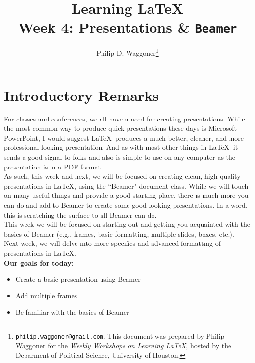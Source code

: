 \documentclass[11pt]{article}
\newcommand{\forceindent}{\leavevmode{\parindent=1.5em\indent}} %
\begin{document}
	
	\title{Learning \LaTeX \\
		\vspace{1cm}
	\large Week 4: Presentations \& \texttt{Beamer} \\ %
		\vspace{1cm}}
	\author{Philip D. Waggoner\footnote{{\texttt{philip.waggoner@gmail.com}}. This document was prepared by Philip Waggoner for the \textit{Weekly Workshops on Learning \LaTeX}, hosted by the Deparment of Political Science, University of Houston.}}
	\date{ } %
	\maketitle

\newpage

\tableofcontents

\newpage

\section{Introductory Remarks}
	
\forceindent For classes and conferences, we all have a need for creating presentations. While the most common way to produce quick presentations these days is Microsoft PowerPoint, I would suggest \LaTeX\ produces a much better, cleaner, and more professional looking presentation. And as with most other things in \LaTeX, it sends a good signal to folks and also is simple to use on any computer as the presentation is in a PDF format. \\

As such, this week and next, we will be focused on creating clean, high-quality presentations in \LaTeX, using the ``Beamer" document class. While we will touch on many useful things and provide a good starting place, there is much more you can do and add to Beamer to create some good looking presentations. In a word, this is scratching the surface to all Beamer can do. \\

This week we will be focused on starting out and getting you acquainted with the basics of Beamer (e.g., frames, basic formatting, multiple slides, boxes, etc.). Next week, we will delve into more specifics and advanced formatting of presentations in \LaTeX. \\

\textbf{Our goals for today:}
\begin{itemize}
	\item Create a basic presentation using Beamer
	\item Add multiple frames
	\item Be familiar with the basics of Beamer
\end{itemize}
\end{document}
